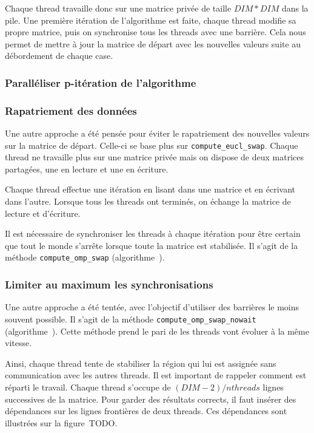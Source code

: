 Chaque thread travaille donc sur une matrice privée de taille
$DIM*DIM$ dans la pile. Une première itération de l'algorithme est
faite, chaque thread modifie sa propre matrice, puis on synchronise
tous les threads avec une barrière. Cela nous permet de mettre à jour
la matrice de départ avec les nouvelles valeurs suite au débordement
de chaque case.
\medskip

\subsubsection{Paralléliser p-itération de l'algorithme}


\subsubsection{Rapatriement des données}

Une autre approche a été pensée pour éviter le rapatriement des
nouvelles valeurs sur la matrice de départ. Celle-ci se base plus
sur \texttt{compute\_eucl\_swap}. Chaque thread ne travaille plus sur
une matrice privée mais on dispose de deux matrices partagées, une en
lecture et une en écriture.

Chaque thread effectue une itération en lisant dans une matrice et en
écrivant dans l'autre. Lorsque tous les threads ont terminés, on
échange la matrice de lecture et d'écriture.

Il est nécessaire de synchroniser les threads à chaque itération pour
être certain que tout le monde s'arrête lorsque toute la matrice est
stabilisée. Il s'agit de la méthode \texttt{compute\_omp\_swap} (algorithme~).
\medskip

\subsubsection{Limiter au maximum les synchronisations}

Une autre approche a été tentée, avec l'objectif d'utiliser des
barrières le moins souvent possible. Il s'agit de la méthode
\texttt{compute\_omp\_swap\_nowait} (algorithme~). Cette méthode prend
le pari de les threads vont évoluer à la même vitesse.

Ainsi, chaque thread tente de stabiliser la région qui lui est
assignée sans communication avec les autres threads. Il est important
de rappeler comment est réparti le travail. Chaque thread s'occupe de
$(DIM-2)/nthreads$ lignes successives de la matrice. Pour garder des
résultats corrects, il faut insérer des dépendances sur les lignes
frontières de deux threads. Ces dépendances sont illustrées sur la
figure~TODO.

